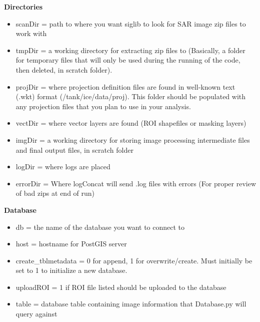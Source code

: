 \documentclass[letterpaper,10pt,openany,oneside]{sphinxmanual}
\begin{document}
\textbf{Directories}
\begin{itemize}
\item {} 
scanDir = path to where you want siglib to look for SAR image zip
files to work with

\item {} 
tmpDir = a working directory for extracting zip files to (Basically,
a folder for temporary files that will only be used during the
running of the code, then deleted, in scratch folder).

\item {} 
projDir = where projection definition files are found in well-known
text (.wkt) format (/tank/ice/data/proj). This folder should be
populated with any projection files that you plan to use in your
analysis.

\item {} 
vectDir = where vector layers are found (ROI shapefiles or masking
layers)

\item {} 
imgDir = a working directory for storing image processing
intermediate files and final output files, in scratch folder

\item {} 
logDir = where logs are placed

\item {} 
errorDir = Where logConcat will send .log files with errors (For
proper review of bad zips at end of run)

\end{itemize}

\textbf{Database}
\begin{itemize}
\item {} 
db = the name of the database you want to connect to

\item {} 
host = hostname for PostGIS server

\item {} 
create\_tblmetadata = 0 for append, 1 for overwrite/create. Must
initially be set to 1 to initialize a new database.

\item {} 
uploadROI = 1 if ROI file listed should be uploaded to the database

\item {} 
table = database table containing image information that Database.py
will query against

\end{itemize}
\end{document}
